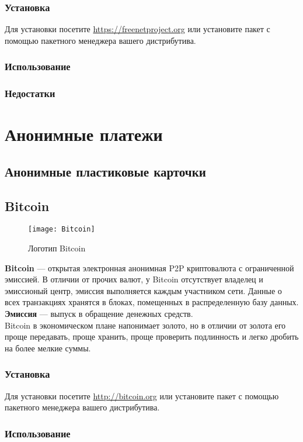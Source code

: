 \subsubsection{Установка}
Для установки посетите \url{https://freenetproject.org} или установите пакет с помощью пакетного менеджера вашего дистрибутива.
\subsubsection{Использование}
\subsubsection{Недостатки}

\section{Анонимные платежи}
\subsection{Анонимные пластиковые карточки}
\subsection{Bitcoin}
\begin{wrapfigure}[6]{r}{0.25\linewidth}
\texttt{[image: Bitcoin]}
\caption{Логотип Bitcoin}
\end{wrapfigure}
\textbf{Bitcoin} --- открытая электронная анонимная P2P криптовалюта с ограниченной эмиссией. В отличии от прочих валют, у Bitcoin отсутствует владелец и эмиссионый центр, эмиссия выполняется каждым участником сети. Данные о всех транзакциях хранятся в блоках, помещенных в распределенную базу данных.\\
\textbf{Эмиссия} --- выпуск в обращение денежных средств.\\
Bitcoin в экономическом плане напонимает золото, но в отличии от золота его проще передавать, проще хранить, проще проверить подлинность и легко дробить на более мелкие суммы.
\subsubsection{Установка}
Для установки посетите \url{http://bitcoin.org} или установите пакет с помощью пакетного менеджера вашего дистрибутива.
\subsubsection{Использование}
